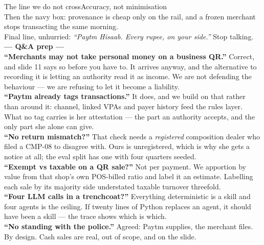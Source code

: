 \documentclass[aspectratio=169,10pt]{beamer}
\begin{document}
\begin{frame}{The line we do not cross}{Accuracy, not minimisation}
{\\[0.4em]
Then the navy box: provenance is cheap only on the rail, and a frozen merchant
stops transacting the same morning.
\\[0.4em]
Final line, unhurried: \emph{``Paytm Hisaab. Every rupee, on your side.''} Stop talking.
\\[0.5em]
{\scriptsize
{\color{navy}\bfseries --- Q\&A prep ---}
\\[0.3em]
\textbf{``Merchants may not take personal money on a business QR.''} Correct, and
slide 11 says so before you have to. It arrives anyway, and the alternative to
recording it is letting an authority read it as income. We are not defending the
behaviour --- we are refusing to let it become a liability.
\\[0.3em]
\textbf{``Paytm already tags transactions.''} It does, and we build on that rather
than around it: channel, linked VPAs and payer history feed the rules layer. What
no tag carries is her attestation --- the part an authority accepts, and the only
part she alone can give.
\\[0.3em]
\textbf{``No return mismatch?''} That check needs a \emph{registered} composition
dealer who filed a CMP-08 to disagree with. Ours is unregistered, which is why she
gets a notice at all; the eval split has one with four quarters seeded.
\\[0.3em]
\textbf{``Exempt vs taxable on a QR sale?''} Not per payment. We apportion by value
from that shop's own POS-billed ratio and label it an estimate. Labelling each sale
by its majority side understated taxable turnover threefold.
\\[0.3em]
\textbf{``Four LLM calls in a trenchcoat?''} Everything deterministic is a skill and
four agents is the ceiling. If twenty lines of Python replaces an agent, it should
have been a skill --- the trace shows which is which.
\\[0.3em]
\textbf{``No standing with the police.''} Agreed: Paytm supplies, the merchant
files. By design. Cash sales are real, out of scope, and on the slide.}}
\end{frame}
\end{document}
